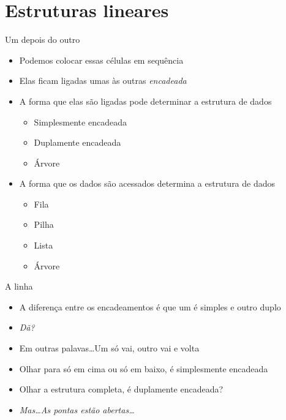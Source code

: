 \documentclass[14pt]{beamer}
\begin{document}
	\section{Estruturas lineares}
		\begin{frame}{Um depois do outro}
			\begin{itemize}
				\presentationPause\item Podemos colocar essas células em sequência
				\presentationPause\item Elas ficam ligadas umas às outras \presentationPause \emph{encadeada}
				\presentationPause\item A forma que elas são ligadas pode determinar a estrutura de dados
				\begin{itemize}
					\presentationPause\item Simplesmente encadeada
					\presentationPause\item Duplamente encadeada
					\presentationPause\item Árvore
				\end{itemize}
				\presentationPause\item A forma que os dados são acessados determina a estrutura de dados
				\begin{itemize}
					\presentationPause\item Fila
					\presentationPause\item Pilha
					\presentationPause\item Lista
					\presentationPause\item Árvore
				\end{itemize}
			\end{itemize}
		\end{frame}

		\begin{frame}{A linha}
			\begin{itemize}
				\presentationPause\item A diferença entre os encadeamentos é que um é simples e outro duplo
				\presentationPause\item \textit{Dã?}
				\presentationPause\item Em outras palavas\dots \presentationPause Um só vai, outro vai e volta
			\end{itemize}
			\presentationPause\begin{figure}[H]
				\centering
				
				\label{fig.dataStructure.open}
			\end{figure}
			\begin{itemize}
				\presentationPause\item Olhar para só em cima ou só em baixo, é simplesmente encadeada
				\presentationPause\item Olhar a estrutura completa, é duplamente encadeada?
				\presentationPause\item \textit{Mas\dots As pontas estão abertas\dots}
			\end{itemize}
		\end{frame}
\end{document}
